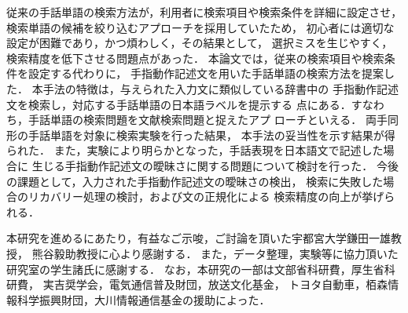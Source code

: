 従来の手話単語の検索方法が，利用者に検索項目や検索条件を詳細に設定させ，
検索単語の候補を絞り込むアプローチを採用していたため，
初心者には適切な設定が困難であり，かつ煩わしく，その結果として，
選択ミスを生じやすく，検索精度を低下させる問題点があった．
本論文では，従来の検索項目や検索条件を設定する代わりに，
手指動作記述文を用いた手話単語の検索方法を提案した．
本手法の特徴は，与えられた入力文に類似している辞書中の
手指動作記述文を検索し，対応する手話単語の日本語ラベルを提示する
点にある．すなわち，手話単語の検索問題を文献検索問題と捉えたアプ
ローチといえる．
両手同形の手話単語を対象に検索実験を行った結果，
本手法の妥当性を示す結果が得られた．
また，実験により明らかとなった，手話表現を日本語文で記述した場合に
生じる手指動作記述文の曖昧さに関する問題について検討を行った．
今後の課題として，入力された手指動作記述文の曖昧さの検出，
検索に失敗した場合のリカバリー処理の検討，および文の正規化による
検索精度の向上が挙げられる．


\acknowledgment

本研究を進めるにあたり，有益なご示唆，ご討論を頂いた宇都宮大学鎌田一雄教授，
熊谷毅助教授に心より感謝する．
また，データ整理，実験等に協力頂いた研究室の学生諸氏に感謝する．
なお，本研究の一部は文部省科研費，厚生省科研費，
実吉奨学会，電気通信普及財団，放送文化基金，
トヨタ自動車，栢森情報科学振興財団，大川情報通信基金の援助によった．







\begin{biography}


\end{biography}


